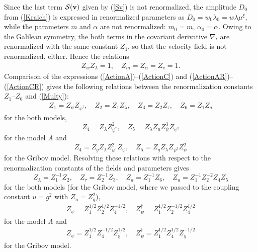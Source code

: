 \documentclass[12pt]{iopart}
\def\S{{\cal S}}
\def\bfv{{\bf v}}
\begin{document}
Since the last term $\S(\bfv)$ given by (\ref{Sv}) is not renormalized,
the amplitude $D_{0}$ from (\ref{Kraich}) is expressed in renormalized
parameters as $D_{0} = w_{0} \lambda_{0}  = w\lambda \mu^{\xi}$, while
the parameters $m$ and $\alpha$ are not renormalized: $m_{0} = m$,
$\alpha_{0} = \alpha$. Owing to the Galilean symmetry, the both terms
in the covariant derivative $\nabla_{t}$ are renormalized with the same
constant $Z_{1}$, so that the velocity field is not renormalized, either.
Hence the relations
\begin{eqnarray}
Z_{w}Z_{\lambda} =1, \quad Z_{m}= Z_{\alpha} = Z_{v} =1.
\label{RenD}
\end{eqnarray}
Comparison of the expressions (\ref{ActionA})--(\ref{ActionC}) and
(\ref{ActionAR})--(\ref{ActionCR}) gives the following relations between
the renormalization constants $Z_{1}$--$Z_{6}$ and (\ref{Multy}):
\begin{eqnarray}
Z_{1} = Z_{\psi} Z_{\psi^{\dagger}}, \quad Z_{2} = Z_{1}Z_{\lambda}, \quad
Z_{3} = Z_{2} Z_{\tau}, \quad Z_{6} = Z_{1} Z_{a}
\label{ZZ}
\end{eqnarray}
for the both models,
\begin{equation}
Z_{4} = Z_{\lambda} Z_{\psi^{\dagger}}^{2}, \quad
Z_{5} = Z_{\lambda}Z_{u} Z_{\psi}^{3} Z_{\psi^{\dagger}}
\label{ZA}
\end{equation}
for the model {\it A} and
\begin{equation}
Z_{4} = Z_{g} Z_{\lambda} Z_{\psi^{\dagger}}^{2} Z_{\psi},
\quad Z_{5} = Z_{g} Z_{\lambda} Z_{\psi^{\dagger}} Z_{\psi}^{2}
\label{ZG}
\end{equation}
for the Gribov model.
Resolving these relations with respect to the renormalization constants
of the fields and parameters gives
\begin{equation}
Z_{\lambda} = Z_{1}^{-1} Z_{2}, \quad Z_{\tau} = Z_{2}^{-1} Z_{3}, \quad
Z_{a} = Z_{1}^{-1} Z_{6}, \quad
Z_{u} = Z_{1}^{-1} Z_{2}^{-2} Z_{4} Z_{5}
\label{ResoC}
\end{equation}
for the both models (for the Gribov model, where we passed to the coupling
constant $u=g^{2}$ with $Z_{u}=Z_{g}^{2}$),
\begin{eqnarray}
Z_{\psi}= Z_{1}^{1/2}Z_{2}^{1/2}Z_{4}^{-1/2}, \quad
Z_{\psi}^{\dag}= Z_{1}^{1/2}Z_{2}^{-1/2}Z_{4}^{1/2}
\label{ResoA}
\end{eqnarray}
for the model {\it A} and
\begin{eqnarray}
Z_{\psi}= Z_{1}^{1/2}Z_{4}^{-1/2}Z_{5}^{1/2}, \quad
Z_{\psi}^{\dag}= Z_{1}^{1/2}Z_{4}^{1/2}Z_{5}^{-1/2}
\label{ResoG}
\end{eqnarray}
for the Gribov model.
\end{document}
